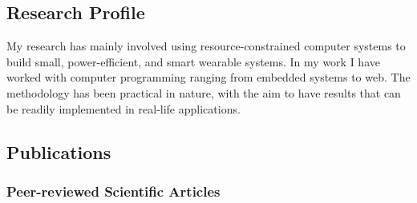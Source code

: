 \documentclass{article}
\begin{document}
\subsection{Research Profile}
My research has mainly involved using resource-constrained computer systems to build small, power-efficient, and smart wearable systems. In my work I have worked with computer programming ranging from embedded systems to web. The methodology has been practical in nature, with the aim to have results that can be readily implemented in real-life applications.



\subsection{Publications}
\subsubsection{Peer-reviewed Scientific Articles}
\end{document}
